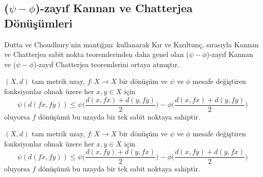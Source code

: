 \documentclass[8pt]{beamer}
\begin{document}
\subsection{($\psi-\phi$)-zay\i f Kannan ve Chatterjea D\"{o}n\"{u}\c{s}\"{u}mleri}
\begin{frame}
Dutta ve Choudhury\cite{Dutta2008}'nin mant\i \u{g}\i n\i \ kullanarak K\i r ve K\i z\i ltun\c{c}\cite{Kir2013}, s\i ras\i yla Kannan ve Chatterjea sabit nokta teoremlerinden daha genel olan ($\psi-\phi$)-zay\i f Kannan ve ($\psi-\phi$)-zay\i f Chatterjea teoremlerini ortaya atm\i \c{s}t\i r.
  \begin{theorem}
     $(X,d)$ tam metrik uzay, $f: X \rightarrow X$ bir d\"{o}n\"{u}\c{s}\"{u}m ve $\psi$ ve $\phi$ mesafe de\u{g}i\c{s}tiren fonksiyonlar olmak \"uzere her $x, y\in X$ i\c{c}in
     \begin{equation*}
       \psi(d(fx,fy))\leq \psi\bigg(\frac{d(x,fx)+d(y,fy)}{2}\bigg)-\phi\bigg(\frac{d(x,fx)+d(y,fy)}{2}\bigg)
     \end{equation*}
oluyorsa $f$ d\"{o}n\"{u}\c{s}\"{u}m\"{u} bu uzayda bir tek sabit noktaya sahiptir.
  \end{theorem}
  \begin{theorem}
     $(X,d)$ tam metrik uzay, $f: X \rightarrow X$ bir d\"{o}n\"{u}\c{s}\"{u}m ve $\psi$ ve $\phi$ mesafe de\u{g}i\c{s}tiren fonksiyonlar olmak \"uzere her $x, y\in X$ i\c{c}in
     \begin{equation*}
       \psi(d(fx,fy))\leq \psi\bigg(\frac{d(x,fy)+d(y,fx)}{2}\bigg)-\phi\bigg(\frac{d(x,fy)+d(y,fx)}{2}\bigg)
     \end{equation*}
oluyorsa $f$ d\"{o}n\"{u}\c{s}\"{u}m\"{u} bu uzayda bir tek sabit noktaya sahiptir.
  \end{theorem}
\end{frame}
\end{document}
